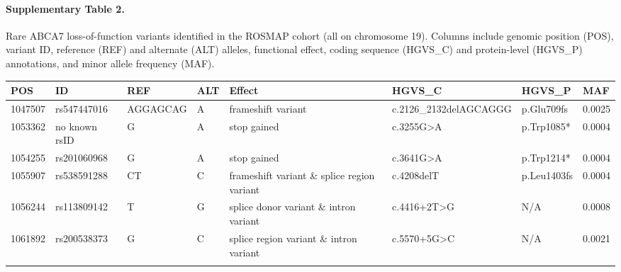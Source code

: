 \paragraph*{Supplementary Table 2.} Rare ABCA7 loss-of-function variants identified in the ROSMAP cohort (all on chromosome 19). Columns include genomic position (POS), variant ID, reference (REF) and alternate (ALT) alleles, functional effect, coding sequence (HGVS\_C) and protein-level (HGVS\_P) annotations, and minor allele frequency (MAF). \\
{}
\begin{longtable}{%
    p{1.5cm}                   %
    p{2.8cm}                   %
    p{2cm}                     %
    p{1cm}                     %
    p{1.5cm}    %
    p{4.5cm}  %
    p{1.7cm}                     %
    p{1cm}                     %
  }
\hline
\textbf{POS} & \textbf{ID} & \textbf{REF} & \textbf{ALT} & \textbf{Effect} & \textbf{HGVS\_C} & \textbf{HGVS\_P} & \textbf{MAF} \\
\hline
\hline
1047507 & rs547447016 & AGGAGCAG & A & frameshift variant                          & c.2126\_2132delAGCAGGG & p.Glu709fs  & 0.0025 \\
\hline
1053362 & no known rsID           & G        & A & stop gained                                 & c.3255G>A               & p.Trp1085*  & 0.0004  \\
\hline
1054255 & rs201060968 & G        & A & stop gained                                 & c.3641G>A               & p.Trp1214*  & 0.0004  \\
\hline
1055907 & rs538591288 & CT       & C & frameshift variant \& splice region variant & c.4208delT              & p.Leu1403fs & 0.0004  \\
\hline
1056244 & rs113809142 & T        & G & splice donor variant \& intron variant      & c.4416+2T>G             &    N/A         & 0.0008  \\
\hline
1061892 & rs200538373 & G        & C & splice region variant \& intron variant     & c.5570+5G>C             &    N/A         & 0.0021 \\
\hline
\label{tab:abca7_lof_simplified}
\end{longtable}



